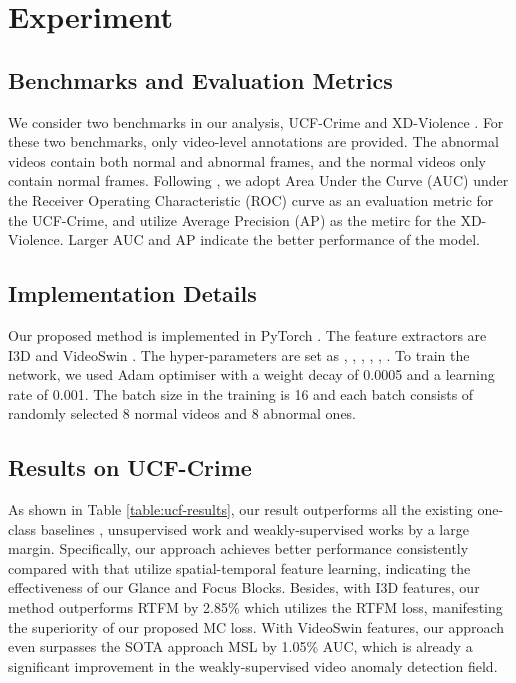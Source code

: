 \documentclass[letterpaper]{article} \usepackage{aaai23}  \usepackage{times}  \usepackage{helvet}  \usepackage{courier}  \usepackage[hyphens]{url}  \usepackage{graphicx} \urlstyle{rm} \def\UrlFont{\rm}  \usepackage{natbib}  \usepackage{caption} \frenchspacing  \setlength{\pdfpagewidth}{8.5in}  \setlength{\pdfpageheight}{11in}  \usepackage{algorithm}
\begin{document}
\section{Experiment}
\subsection{Benchmarks and Evaluation Metrics}
We consider two benchmarks in our analysis, UCF-Crime \cite{RWAD} and XD-Violence \cite{Not-only-look}. 
For these two benchmarks, only video-level annotations are provided. The abnormal videos contain both normal and abnormal frames, and the normal videos only contain normal frames. 
Following \cite{claws,Not-only-look,RTFM,LCTR,motion-aware}, we adopt Area Under the Curve (AUC) under the Receiver Operating Characteristic (ROC) curve as an evaluation metric for the UCF-Crime, and utilize Average Precision (AP) as the metirc for the XD-Violence. Larger AUC and AP indicate the better performance of the model. 

\subsection{Implementation Details}
Our proposed method is implemented in PyTorch \cite{pytor}. The feature extractors are I3D \cite{i3d} and VideoSwin \cite{videoswin}. The hyper-parameters are set as {\small}, {\small}, {\small}, {\small}, {\small}, {\small}. To train the network, we used Adam optimiser \cite{adam} with a weight decay of 0.0005 and a learning rate of 0.001. The batch size {\small} in the training is 16 and each batch consists of randomly selected 8 normal videos and 8 abnormal ones.


\subsection{Results on UCF-Crime}
As shown in Table \ref{table:ucf-results}, our result outperforms all the existing one-class baselines \cite{un1,SCR,un2}, unsupervised work \cite{one-class} and weakly-supervised works \cite{RWAD,MIST,Not-only-look,RTFM,one-class} by a large margin. Specifically, our approach achieves better performance consistently compared with \cite{Not-only-look,RTFM,LCTR} that utilize spatial-temporal feature learning, indicating the effectiveness of our Glance and Focus Blocks. 
Besides, with I3D features, our method outperforms RTFM \cite{RTFM} by 2.85\% which utilizes the RTFM loss, manifesting the superiority of our proposed MC loss. With VideoSwin features, our approach even surpasses the SOTA approach MSL \cite{MSL} by 1.05\% AUC, which is already a significant improvement in the weakly-supervised video anomaly detection field. 
\end{document}
